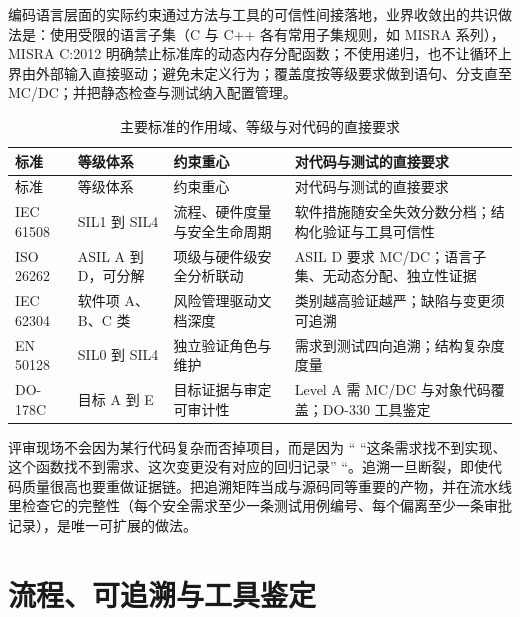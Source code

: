 \documentclass[12pt,a4paper,fontset=fandol]{ctexbook}
\newcommand{\Lang}[1]{\textsf{#1}}
\begin{document}
编码语言层面的实际约束通过方法与工具的可信性间接落地，业界收敛出的共识做法是：使用受限的语言子集（\Lang{C} 与 \Lang{C++} 各有常用子集规则，如 MISRA 系列），MISRA C:2012 明确禁止标准库的动态内存分配函数；不使用递归，也不让循环上界由外部输入直接驱动；避免未定义行为；覆盖度按等级要求做到语句、分支直至 MC/DC；并把静态检查与测试纳入配置管理。

\begin{longtable}{>{\raggedright\arraybackslash}p{}>{\raggedright\arraybackslash}p{}>{\raggedright\arraybackslash}p{}>{\raggedright\arraybackslash}p{}}
\caption{主要标准的作用域、等级与对代码的直接要求}\label{tab:ch14-standards}\\
\toprule
标准 & 等级体系 & 约束重心 & 对代码与测试的直接要求 \\
\midrule
\endfirsthead
\toprule
标准 & 等级体系 & 约束重心 & 对代码与测试的直接要求 \\
\midrule
\endhead
\bottomrule
\endfoot
\endlastfoot
IEC 61508 & SIL1 到 SIL4 & 流程、硬件度量与安全生命周期 & 软件措施随安全失效分数分档；结构化验证与工具可信性 \\
ISO 26262 & ASIL A 到 D，可分解 & 项级与硬件级安全分析联动 & ASIL D 要求 MC/DC；语言子集、无动态分配、独立性证据 \\
IEC 62304 & 软件项 A、B、C 类 & 风险管理驱动文档深度 & 类别越高验证越严；缺陷与变更须可追溯 \\
EN 50128 & SIL0 到 SIL4 & 独立验证角色与维护 & 需求到测试四向追溯；结构复杂度度量 \\
DO-178C & 目标 A 到 E & 目标证据与审定可审计性 & Level A 需 MC/DC 与对象代码覆盖；DO-330 工具鉴定 \\
\end{longtable}

\begin{warning}[title={追溯断裂是认证现场最常见的直接失败原因}]
评审现场不会因为某行代码复杂而否掉项目，而是因为 `` ``这条需求找不到实现、这个函数找不到需求、这次变更没有对应的回归记录'' ``。追溯一旦断裂，即使代码质量很高也要重做证据链。把追溯矩阵当成与源码同等重要的产物，并在流水线里检查它的完整性（每个安全需求至少一条测试用例编号、每个偏离至少一条审批记录），是唯一可扩展的做法。
\end{warning}

\section{流程、可追溯与工具鉴定}
\label{sec:ch14-process}
\end{document}
